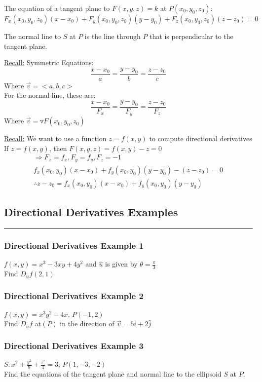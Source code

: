 \documentclass[12pt]{article}
\begin{document}
The equation of a tangent plane to \(F(x,y,z) = k\) at \(P(x_0,y_0,z_0)\):
\[
	F_x(x_0,y_0,z_0) (x-x_0) + F_y(x_0,y_0,z_0) (y-y_0) + F_z(x_0,y_0,z_0) (z-z_0) = 0
\]

The normal line to \(S\) at \(P\) is the line through \(P\) that is perpendicular to the tangent plane.

\underline{Recall:} Symmetric Equations:
\[
	\frac{x-x_0}{a} = \frac{y-y_0}{b} = \frac{z-z_0}{c}
\]
Where \(\vec{v}  = <a,b,c>\)\\
For the normal line, these are:
\[
	\frac{x-x_0}{F_x} = \frac{y-y_0}{F_y} = \frac{z-z_0}{F_z}
\]
Where \(\vec{v}  = \triangledown F(x_0,y_0,z_0)\)

\underline{Recall:} We want to use a function \(z = f(x,y)\) to compute directional derivatives\\
If \(z = f(x,y)\), then \(F(x,y,z) = f(x,y) - z = 0\)
\begin{align*}
	\Rightarrow F_x = f_x, F_y = f_y, F_z = -1\\
	f_x(x_0,y_0)(x-x_0) + f_y(x_0,y_0)(y-y_0) - (z-z_0) = 0\\
	\therefore z-z_0 = f_x(x_0,y_0)(x-x_0) + f_y(x_0,y_0)(y-y_0)
\end{align*}

\subsection{Directional Derivatives Examples}
\rule{\textwidth}{0.1mm}

\subsubsection{Directional Derivatives Example 1}
\(f(x,y) = x^3 - 3xy + 4y^2\) and \(\hat{u}\) is given by \(\theta = \frac{\pi}{3}\)\\
Find \(D_{\hat{u}}f(2,1)\)

\subsubsection{Directional Derivatives Example 2}
\(f(x,y) = x^3y^2 - 4x\), \(P(-1,2)\)\\
Find \(D_{\hat{u}}f\) at\((P)\) in the direction of \(\vec{v} = 5\hat{i} + 2\hat{j}\)

\subsubsection{Directional Derivatives Example 3}
\(S: x^2 + \frac{y^2}{9} + \frac{z^2}{4} = 3\); \(P(1,-3,-2)\)\\
Find the equations of the tangent plane and normal line to the ellipsoid \(S\) at \(P\).
\end{document}
